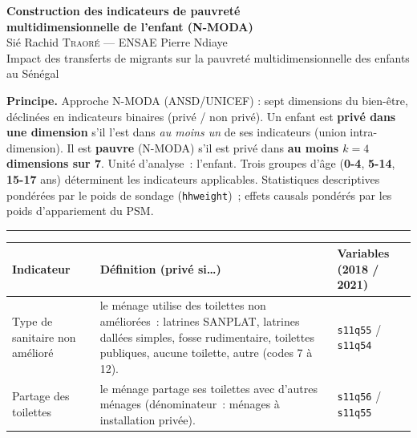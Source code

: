 \documentclass[11pt,a4paper]{article}
\newcommand{\dimtitle}[1]{\vspace{4pt}\noindent{\color{entete}\large\bfseries #1}\par\vspace{2pt}}
\begin{document}
\begin{center}
  {\LARGE\bfseries\color{entete} Construction des indicateurs de pauvreté\\[2pt]
   multidimensionnelle de l'enfant (N-MODA)}\\[6pt]
  {\normalsize Sié Rachid \textsc{Traoré} --- ENSAE Pierre Ndiaye}\\[2pt]
  {\small Impact des transferts de migrants sur la pauvreté multidimensionnelle des enfants au Sénégal}
\end{center}

\vspace{4pt}

\noindent\textbf{Principe.} Approche N-MODA (ANSD/UNICEF) : sept dimensions du
bien-être, déclinées en indicateurs binaires (privé / non privé). Un enfant est
\textbf{privé dans une dimension} s'il l'est dans \emph{au moins un} de ses
indicateurs (union intra-dimension). Il est \textbf{pauvre} (N-MODA) s'il est
privé dans \textbf{au moins $k=4$ dimensions sur 7}. Unité d'analyse~: l'enfant.
Trois groupes d'âge (\textbf{0-4}, \textbf{5-14}, \textbf{15-17} ans)
déterminent les indicateurs applicables. Statistiques descriptives pondérées
par le poids de sondage (\texttt{hhweight})~; effets causals pondérés par les
poids d'appariement du PSM.

\vspace{8pt}
\hrule
\vspace{8pt}

\dimtitle{1. Assainissement}
\begin{tabularx}{\textwidth}{L{3.1cm} X L{3.3cm}}
\toprule
\textbf{Indicateur} & \textbf{Définition (privé si\dots)} & \textbf{Variables (2018 / 2021)} \\
\midrule
Type de sanitaire non amélioré & le ménage utilise des toilettes non améliorées~: latrines SANPLAT, latrines dallées simples, fosse rudimentaire, toilettes publiques, aucune toilette, autre (codes 7 à 12). & \texttt{s11q55} / \texttt{s11q54} \\
Partage des toilettes & le ménage partage ses toilettes avec d'autres ménages (dénominateur~: ménages à installation privée). & \texttt{s11q56} / \texttt{s11q55} \\
\bottomrule
\end{tabularx}
\end{document}
